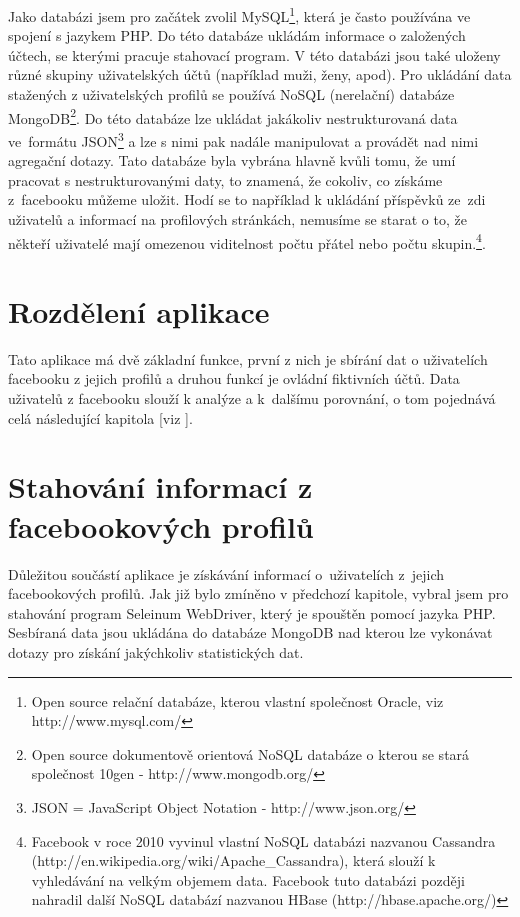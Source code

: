 \documentclass[thesis=M,czech]{FITthesis}[2013/05/10]
\begin{document}
Jako databázi jsem pro začátek zvolil MySQL\footnote{Open source 
relační databáze, kterou vlastní společnost Oracle, viz 
http://www.mysql.com/},
která je často používána ve spojení s jazykem PHP. Do této databáze ukládám
informace o založených účtech, se kterými pracuje stahovací program.
V této databázi jsou také uloženy různé skupiny uživatelských účtů
(například muži, ženy, apod).
Pro ukládání data stažených z uživatelských profilů se používá 
NoSQL (nerelační) databáze 
MongoDB\footnote{Open source dokumentově orientová NoSQL databáze o 
kterou se stará společnost 10gen - http://www.mongodb.org/}. 
Do této databáze lze ukládat jakákoliv nestrukturovaná data 
ve~formátu 
JSON\footnote{JSON = JavaScript Object Notation - 
http://www.json.org/} 
a lze s nimi pak nadále manipulovat a provádět nad nimi agregační 
dotazy. Tato databáze byla vybrána hlavně kvůli tomu, že umí pracovat 
s nestrukturovanými daty, to znamená, že cokoliv, co získáme
z~facebooku můžeme uložit. Hodí se to například k ukládání 
příspěvků ze~zdi uživatelů a informací na profilových stránkách,
nemusíme se starat o to, že někteří uživatelé mají omezenou 
viditelnost počtu přátel nebo počtu 
skupin.\footnote{Facebook v roce 2010 vyvinul vlastní NoSQL databázi
nazvanou Cassandra 
(http://en.wikipedia.org/wiki/Apache\_Cassandra),
která slouží k vyhledávání na velkým objemem data.
Facebook tuto databázi později nahradil další NoSQL databází 
nazvanou HBase (http://hbase.apache.org/)}.

\section{Rozdělení aplikace}

Tato aplikace má dvě základní funkce, první z nich je sbírání dat o 
uživatelích facebooku z jejich profilů a druhou funkcí je ovládní 
fiktivních účtů. Data uživatelů z facebooku slouží k analýze 
a k~dalšímu porovnání, o tom pojednává celá následující kapitola [viz ]. 

\section{Stahování informací z facebookových profilů}

Důležitou součástí aplikace je získávání informací o~uživatelích 
z~jejich facebookových profilů. Jak již bylo zmíněno v předchozí
kapitole, vybral jsem pro stahování program Seleinum WebDriver, 
který je spouštěn pomocí jazyka PHP. 
Sesbíraná data jsou ukládána do databáze MongoDB nad kterou lze 
vykonávat dotazy pro získání jakýchkoliv statistických dat.
\end{document}
